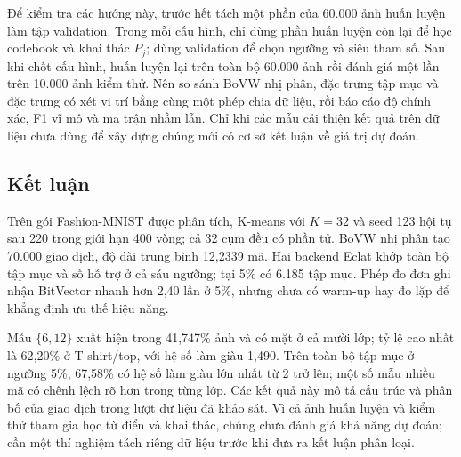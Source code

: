 Để kiểm tra các hướng này, trước hết tách một phần của 60.000 ảnh huấn luyện làm tập validation. Trong mỗi cấu hình, chỉ dùng phần huấn luyện còn lại để học codebook và khai thác $P_j$; dùng validation để chọn ngưỡng và siêu tham số. Sau khi chốt cấu hình, huấn luyện lại trên toàn bộ 60.000 ảnh rồi đánh giá một lần trên 10.000 ảnh kiểm thử. Nên so sánh BoVW nhị phân, đặc trưng tập mục và đặc trưng có xét vị trí bằng cùng một phép chia dữ liệu, rồi báo cáo độ chính xác, F1 vĩ mô và ma trận nhầm lẫn. Chỉ khi các mẫu cải thiện kết quả trên dữ liệu chưa dùng để xây dựng chúng mới có cơ sở kết luận về giá trị dự đoán.

\subsection{Kết luận}

Trên gói Fashion-MNIST được phân tích, K-means với $K=32$ và seed 123 hội tụ sau 220 trong giới hạn 400 vòng; cả 32 cụm đều có phần tử. BoVW nhị phân tạo 70.000 giao dịch, độ dài trung bình 12,2339 mã. Hai backend Eclat khớp toàn bộ tập mục và số hỗ trợ ở cả sáu ngưỡng; tại 5\% có 6.185 tập mục. Phép đo đơn ghi nhận BitVector nhanh hơn 2,40 lần ở 5\%, nhưng chưa có warm-up hay đo lặp để khẳng định ưu thế hiệu năng.

Mẫu $\{6,12\}$ xuất hiện trong 41,747\% ảnh và có mặt ở cả mười lớp; tỷ lệ cao nhất là 62,20\% ở T-shirt/top, với hệ số làm giàu 1,490. Trên toàn bộ tập mục ở ngưỡng 5\%, 67,58\% có hệ số làm giàu lớn nhất từ 2 trở lên; một số mẫu nhiều mã có chênh lệch rõ hơn trong từng lớp. Các kết quả này mô tả cấu trúc và phân bố của giao dịch trong lượt dữ liệu đã khảo sát. Vì cả ảnh huấn luyện và kiểm thử tham gia học từ điển và khai thác, chúng chưa đánh giá khả năng dự đoán; cần một thí nghiệm tách riêng dữ liệu trước khi đưa ra kết luận phân loại.
